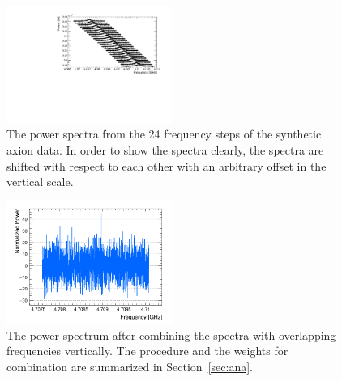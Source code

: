 \begin{figure}[htbp]                                                                                                  
    \centering                                                                                                                       
    \includegraphics[width=0.48\textwidth]{figures/RawSpectra_Faxion_YAxis_Shifted.pdf}
 \caption{The power spectra from the 24 frequency steps of the synthetic axion 
data. In order to show the spectra clearly, the spectra are shifted 
with respect to each other with an arbitrary offset in the vertical scale.}                
\label{fig:faxionstep}                                                                                                            
\end{figure}                       

\begin{figure}[htbp]                                                                                                  
    \centering                                                                                                                       
    \includegraphics[width=0.48\textwidth]{figures/Power_CombSpectrum_FaxionRun_AllSteps_Rescan_SG4_W201_LqWeight.png}
    \caption{The power spectrum after combining the spectra with overlapping 
frequencies vertically. The procedure and the weights for combination 
are summarized in Section~\ref{sec:ana}.}                
\label{fig:faxioncombine}                                                                                                            
\end{figure}                       


